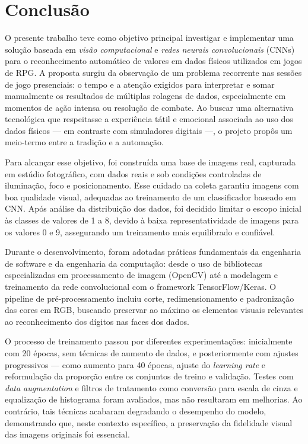 \section{Conclusão}

O presente trabalho teve como objetivo principal investigar e implementar uma solução baseada em \textit{visão computacional} e 
\textit{redes neurais convolucionais} (CNNs) para o reconhecimento automático de valores em dados físicos utilizados em jogos de RPG. 
A proposta surgiu da observação de um problema recorrente nas sessões de jogo presenciais: o tempo e a atenção exigidos para interpretar 
e somar manualmente os resultados de múltiplas rolagens de dados, especialmente em momentos de ação intensa ou resolução de combate. 
Ao buscar uma alternativa tecnológica que respeitasse a experiência tátil e emocional associada ao uso dos dados físicos — em contraste 
com simuladores digitais —, o projeto propôs um meio-termo entre a tradição e a automação.

Para alcançar esse objetivo, foi construída uma base de imagens real, capturada em estúdio fotográfico, com dados reais e sob 
condições controladas de iluminação, foco e posicionamento. Esse cuidado na coleta garantiu imagens com boa qualidade visual, 
adequadas ao treinamento de um classificador baseado em CNN. Após análise da distribuição dos dados, foi decidido limitar o escopo 
inicial às classes de valores de 1 a 8, devido à baixa representatividade de imagens para os valores 0 e 9, assegurando um treinamento 
mais equilibrado e confiável.

Durante o desenvolvimento, foram adotadas práticas fundamentais da engenharia de software e da engenharia da computação: desde o 
uso de bibliotecas especializadas em processamento de imagem (OpenCV) até a modelagem e treinamento da rede convolucional com o 
framework TensorFlow/Keras. O pipeline de pré-processamento incluiu corte, redimensionamento e padronização das cores em RGB, buscando 
preservar ao máximo os elementos visuais relevantes ao reconhecimento dos dígitos nas faces dos dados.

O processo de treinamento passou por diferentes experimentações: inicialmente com 20 épocas, sem técnicas de aumento de dados, e 
posteriormente com ajustes progressivos — como aumento para 40 épocas, ajuste do \textit{learning rate} e reformulação da proporção 
entre os conjuntos de treino e validação. Testes com \textit{data augmentation} e filtros de tratamento como conversão para escala de 
cinza e equalização de histograma foram avaliados, mas não resultaram em melhorias. Ao contrário, tais técnicas acabaram degradando o 
desempenho do modelo, demonstrando que, neste contexto específico, a preservação da fidelidade visual das imagens originais foi essencial.

